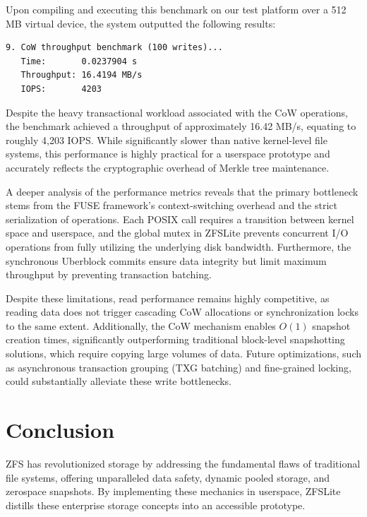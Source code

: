\documentclass[pdflatex,sn-mathphys-num]{sn-jnl}
\begin{document}
Upon compiling and executing this benchmark on our test platform over a 512\,MB virtual device, the system outputted the following results:
\begin{verbatim}
9. CoW throughput benchmark (100 writes)...
   Time:       0.0237904 s
   Throughput: 16.4194 MB/s
   IOPS:       4203
\end{verbatim}

Despite the heavy transactional workload associated with the CoW operations, the benchmark achieved a throughput of approximately 16.42 MB/s, equating to roughly 4,203 IOPS. While significantly slower than native kernel-level file systems, this performance is highly practical for a userspace prototype and accurately reflects the cryptographic overhead of Merkle tree maintenance.

A deeper analysis of the performance metrics reveals that the primary bottleneck stems from the FUSE framework's context-switching overhead and the strict serialization of operations. Each POSIX call requires a transition between kernel space and userspace, and the global mutex in ZFSLite prevents concurrent I/O operations from fully utilizing the underlying disk bandwidth. Furthermore, the synchronous Uberblock commits ensure data integrity but limit maximum throughput by preventing transaction batching. 

Despite these limitations, read performance remains highly competitive, as reading data does not trigger cascading CoW allocations or synchronization locks to the same extent. Additionally, the CoW mechanism enables $O(1)$ snapshot creation times, significantly outperforming traditional block-level snapshotting solutions, which require copying large volumes of data. Future optimizations, such as asynchronous transaction grouping (TXG batching) and fine-grained locking, could substantially alleviate these write bottlenecks.



\section{Conclusion}\label{sec:conclusion}

ZFS has revolutionized storage by addressing the fundamental flaws of traditional file systems, offering unparalleled data safety, dynamic pooled storage, and zerospace snapshots. By implementing these mechanics in userspace, ZFSLite distills these enterprise storage concepts into an accessible prototype.
\end{document}

